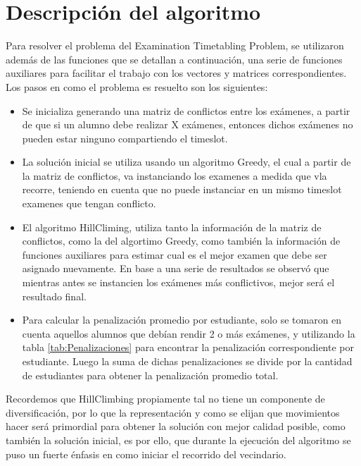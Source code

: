 \section{Descripci\'on del algoritmo}
Para resolver el problema del Examination Timetabling Problem, se utilizaron además de las funciones que se detallan a continuación, una serie de funciones auxiliares para facilitar el trabajo con los vectores y matrices correspondientes. \\
Los pasos en como el problema es resuelto son los siguientes:
\begin{itemize}
    \item Se inicializa generando una matriz de conflictos entre los exámenes, a partir de que si un alumno debe realizar X exámenes, entonces dichos exámenes no pueden estar ninguno compartiendo el timeslot.
    \item La solución inicial se utiliza usando un algoritmo Greedy, el cual a partir de la matriz de conflictos, va instanciando los examenes a medida que vla recorre, teniendo en cuenta que no puede instanciar en un mismo timeslot examenes que tengan conflicto.
    \item El algoritmo HillCliming, utiliza tanto la información de la matriz de conflictos, como la del algortimo Greedy, como también la información de funciones auxiliares para estimar cual es el mejor examen que debe ser asignado nuevamente. En base a una serie de resultados se observó que mientras antes se instancien los exámenes más conflictivos, mejor será el resultado final.
    \item Para calcular la penalización promedio por estudiante, solo se tomaron en cuenta aquellos alumnos que debían rendir 2 o más exámenes, y utilizando la tabla \ref{tab:Penalizaciones} para encontrar la penalización correspondiente por estudiante. Luego la suma de dichas penalizaciones se divide por la cantidad de estudiantes para obtener la penalización promedio total.
\end{itemize}
Recordemos que HillClimbing propiamente tal no tiene un componente de diversificación, por lo que la representación y como se elijan que movimientos hacer será primordial para obtener la solución con mejor calidad posible, como también la solución inicial, es por ello, que durante la ejecución del algoritmo se puso un fuerte énfasis en como iniciar el recorrido del vecindario.


